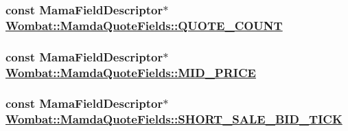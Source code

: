 \hypertarget{classWombat_1_1MamdaQuoteFields_2175c0229010fdac0fe691cd1a09093e}{
\subsubsection[QUOTE\_\-COUNT]{\setlength{\rightskip}{0pt plus 5cm}const Mama\-Field\-Descriptor$\ast$ \hyperlink{classWombat_1_1MamdaQuoteFields_2175c0229010fdac0fe691cd1a09093e}{Wombat::Mamda\-Quote\-Fields::QUOTE\_\-COUNT}}}
\label{classWombat_1_1MamdaQuoteFields_2175c0229010fdac0fe691cd1a09093e}


\hypertarget{classWombat_1_1MamdaQuoteFields_0e5e0283a7307712f205db3808376640}{
\subsubsection[MID\_\-PRICE]{\setlength{\rightskip}{0pt plus 5cm}const Mama\-Field\-Descriptor$\ast$ \hyperlink{classWombat_1_1MamdaQuoteFields_0e5e0283a7307712f205db3808376640}{Wombat::Mamda\-Quote\-Fields::MID\_\-PRICE}}}
\label{classWombat_1_1MamdaQuoteFields_0e5e0283a7307712f205db3808376640}


\hypertarget{classWombat_1_1MamdaQuoteFields_59af90098dfc8645f7245206e60cb2f3}{
\subsubsection[SHORT\_\-SALE\_\-BID\_\-TICK]{\setlength{\rightskip}{0pt plus 5cm}const Mama\-Field\-Descriptor$\ast$ \hyperlink{classWombat_1_1MamdaQuoteFields_59af90098dfc8645f7245206e60cb2f3}{Wombat::Mamda\-Quote\-Fields::SHORT\_\-SALE\_\-BID\_\-TICK}}}
\label{classWombat_1_1MamdaQuoteFields_59af90098dfc8645f7245206e60cb2f3}


